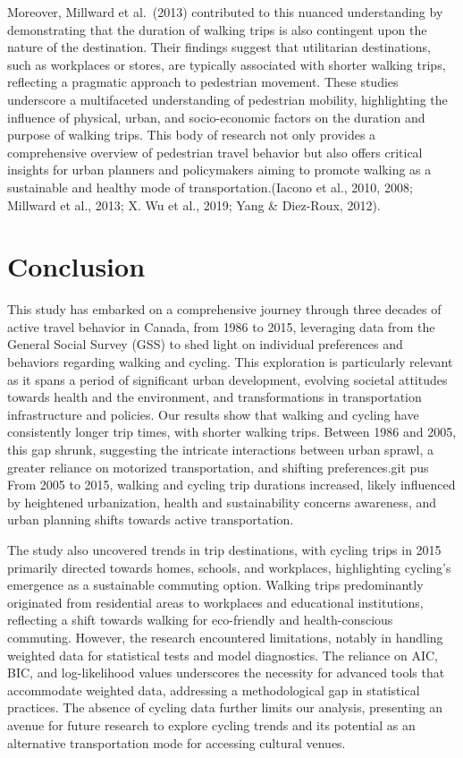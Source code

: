 \documentclass[
11pt, %
oneside, %
english, %
singlespacing, %
]{macthesis} %
\begin{document}
Moreover, Millward et al.~(2013) contributed to this nuanced understanding by demonstrating that the duration of walking trips is also contingent upon the nature of the destination. Their findings suggest that utilitarian destinations, such as workplaces or stores, are typically associated with shorter walking trips, reflecting a pragmatic approach to pedestrian movement.
These studies underscore a multifaceted understanding of pedestrian mobility, highlighting the influence of physical, urban, and socio-economic factors on the duration and purpose of walking trips. This body of research not only provides a comprehensive overview of pedestrian travel behavior but also offers critical insights for urban planners and policymakers aiming to promote walking as a sustainable and healthy mode of transportation.(Iacono et al., 2010, 2008; Millward et al., 2013; X. Wu et al., 2019; Yang \& Diez-Roux, 2012).

\chapter*{Conclusion}\label{conclusion}

This study has embarked on a comprehensive journey through three decades of active travel behavior in Canada, from 1986 to 2015, leveraging data from the General Social Survey (GSS) to shed light on individual preferences and behaviors regarding walking and cycling. This exploration is particularly relevant as it spans a period of significant urban development, evolving societal attitudes towards health and the environment, and transformations in transportation infrastructure and policies.
Our results show that walking and cycling have consistently longer trip times, with shorter walking trips. Between 1986 and 2005, this gap shrunk, suggesting the intricate interactions between urban sprawl, a greater reliance on motorized transportation, and shifting preferences.git pus From 2005 to 2015, walking and cycling trip durations increased, likely influenced by heightened urbanization, health and sustainability concerns awareness, and urban planning shifts towards active transportation.

The study also uncovered trends in trip destinations, with cycling trips in 2015 primarily directed towards homes, schools, and workplaces, highlighting cycling's emergence as a sustainable commuting option. Walking trips predominantly originated from residential areas to workplaces and educational institutions, reflecting a shift towards walking for eco-friendly and health-conscious commuting.
However, the research encountered limitations, notably in handling weighted data for statistical tests and model diagnostics. The reliance on AIC, BIC, and log-likelihood values underscores the necessity for advanced tools that accommodate weighted data, addressing a methodological gap in statistical practices. The absence of cycling data further limits our analysis, presenting an avenue for future research to explore cycling trends and its potential as an alternative transportation mode for accessing cultural venues.
\end{document}
